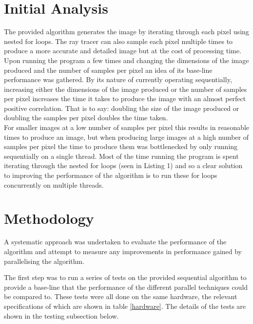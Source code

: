 \documentclass[journal,transmag]{IEEEtran}
\begin{document}
	\section{Initial Analysis}
	The provided algorithm generates the image by iterating through each pixel using nested for loops. The ray tracer can also sample each pixel multiple times to produce a more accurate and detailed image but at the cost of processing time. Upon running the program a few times and changing the dimensions of the image produced and the number of samples per pixel an idea of its base-line performance was gathered.  By its nature of currently operating sequentially, increasing either the dimensions of the image produced or the number of samples per pixel increases the time it takes to produce the image with an almost perfect positive correlation. That is to say: doubling the size of the image produced or doubling the samples per pixel doubles the time taken.\\
	
	
	
	For smaller images at a low number of samples per pixel this results in reasonable times to produce an image, but when producing large images at a high number of samples per pixel the time to produce them was bottlenecked by only running sequentially on a single thread. Most of the time running the program is spent iterating through the nested for loops (seen in Listing 1) and so a clear solution to improving the performance of the algorithm is to run these for loops concurrently on multiple threads.
	
	
	\section{Methodology}	
	A systematic approach was undertaken to evaluate the performance of the algorithm and attempt to measure any improvements in performance gained by parallelising the algorithm.
	
	The first step was to run a series of tests on the provided sequential algorithm to provide a base-line that the performance of the different parallel techniques could be compared to. These tests were all done on the same hardware, the relevant specifications of which are shown in table \ref{hardware}. The details of the tests are shown in the testing subsection below.
	
\end{document}
